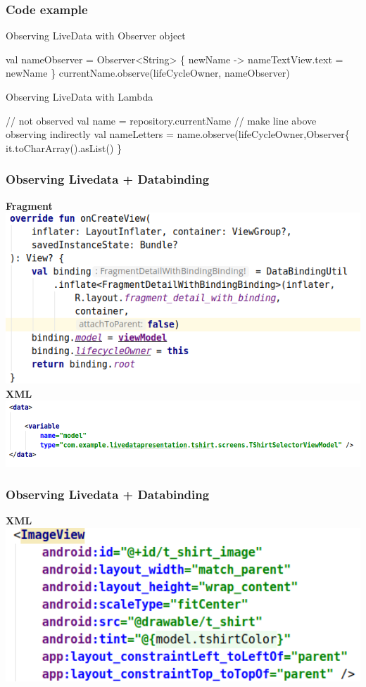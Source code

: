 \documentclass{beamer}
\begin{document}
	\begin{frame}[fragile]
	\frametitle{Code example}
		\begin{block}{Observing LiveData with Observer object}
			\begin{semiverbatim}
			val nameObserver = Observer<String> \{ newName ->
        	\quad nameTextView.text = newName
    		\}
			currentName.observe(lifeCycleOwner, nameObserver)
		\end{semiverbatim}
	\end{block}
	\begin{block}{Observing LiveData with Lambda}
		\begin{semiverbatim}
			// not observed
			val name = repository.currentName
			// make line above observing indirectly
			val nameLetters = name.observe(lifeCycleOwner,Observer\{
			\quad it.toCharArray().asList()
			\}
		\end{semiverbatim}
	\end{block}
	\end{frame}
	
	\begin{frame}
	\frametitle{Observing Livedata + Databinding }
	\textbf{Fragment}
	\includegraphics[width=1\textwidth]{DataBindingInFragment.png}
	\textbf{XML}
	\includegraphics[width=1\textwidth]{DataBindingInXML.png}
	\end{frame}
	
	\begin{frame}	
	\frametitle{Observing Livedata + Databinding}
	\textbf{XML}
	\includegraphics[width=1\textwidth]{DataBindingInImageView.png}
	\end{frame}
	
\end{document}
